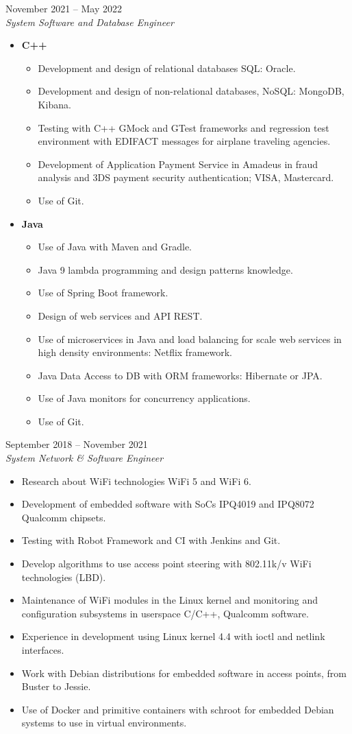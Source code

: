 \documentclass[11pt,a4paper]{article}
\newenvironment{job}[3]{%
  \vspace{0.55em}%
  \noindent{\bfseries #1}\hfill{\color{cvaccent}#2}\\[0.1em]
  \textit{#3}\par
  \begin{itemize}
}{%
  \end{itemize}
}
\begin{document}
\begin{job}{Capgenemi}{November 2021 -- May 2022}{System Software and Database Engineer}
  \item \textbf{C++}
  \begin{itemize}
    \item Development and design of relational databases SQL: Oracle.
    \item Development and design of non-relational databases, NoSQL: MongoDB, Kibana.
    \item Testing with C++ GMock and GTest frameworks and regression test environment with EDIFACT messages for airplane traveling agencies.
    \item Development of Application Payment Service in Amadeus in fraud analysis and 3DS payment security authentication; VISA, Mastercard.
    \item Use of Git.
  \end{itemize}
  \item \textbf{Java}
  \begin{itemize}
    \item Use of Java with Maven and Gradle.
    \item Java 9 lambda programming and design patterns knowledge.
    \item Use of Spring Boot framework.
    \item Design of web services and API REST.
    \item Use of microservices in Java and load balancing for scale web services in high density environments: Netflix framework.
    \item Java Data Access to DB with ORM frameworks: Hibernate or JPA.
    \item Use of Java monitors for concurrency applications.
    \item Use of Git.
  \end{itemize}
\end{job}

\begin{job}{Teldat S.A.}{September 2018 -- November 2021}{System Network \& Software Engineer}
  \item Research about WiFi technologies WiFi 5 and WiFi 6.
  \item Development of embedded software with SoCs IPQ4019 and IPQ8072 Qualcomm chipsets.
  \item Testing with Robot Framework and CI with Jenkins and Git.
  \item Develop algorithms to use access point steering with 802.11k/v WiFi technologies (LBD).
  \item Maintenance of WiFi modules in the Linux kernel and monitoring and configuration subsystems in userspace C/C++, Qualcomm software.
  \item Experience in development using Linux kernel 4.4 with ioctl and netlink interfaces.
  \item Work with Debian distributions for embedded software in access points, from Buster to Jessie.
  \item Use of Docker and primitive containers with schroot for embedded Debian systems to use in virtual environments.
\end{job}
\end{document}

